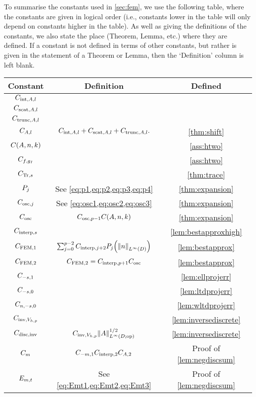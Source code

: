 To summarise the constants used in \cref{sec:fem}, we use the following table, where the constants are given in logical order (i.e., constants lower in the table will only depend on constants higher in the table). As well as giving the definitions of the constants, we also state the place (Theorem, Lemma, etc.) where they are defined. If a constant is not defined in terms of other constants, but rather is given in the statement of a Theorem or Lemma, then the `Definition' column is left blank.

\begin{tabular}{ccc}
  \toprule
  Constant & Definition & Defined\\
  \midrule
  $C_{\mathrm{int},A,l}$ & & \cite[Theorem 4.16]{Mc:00}\\
  $C_{\mathrm{scat},A,l}$ & & \cite[Theorem 4.18(i)]{Mc:00}\\
    $C_{\mathrm{trunc},A,l}$ & & \cite[Theorem 4.18(ii)]{Mc:00}\\
  $C_{A,l}$ & $C_{\mathrm{int},A,l} + C_{\mathrm{scat},A,l} + C_{\mathrm{trunc},A,l}.$ & \cref{thm:shift}\\
  $\CAnk$ && \cref{ass:htwo}\\
  $C_{f,g_{I}}$ && \cref{ass:htwo}\\
  $C_{\mathrm{Tr},s}$ && \cref{thm:trace}\\
  $P_{j}$ & See \cref{eq:p1,eq:p2,eq:p3,eq:p4}& \cref{thm:expansion}\\
  $C_{\mathrm{osc},j}$ & See \cref{eq:osc1,eq:osc2,eq:osc3} & \cref{thm:expansion}\\
  $C_{\mathrm{osc}}$ & $\Coscfn{p-1}\CAnk$ & \cref{thm:expansion}\\
  $C_{\mathrm{interp},s}$ && \cref{lem:bestapproxhigh}\\
  $C_{\mathrm{FEM},1}$ & $\sum_{j=0}^{p-2}\Cinterpfn{j+2} \Pj\mleft(\NLiD{n}\mright)$ & \cref{lem:bestapprox}\\
  $C_{\mathrm{FEM},2}$ & $C_{\mathrm{FEM},2} = C_{\mathrm{interp},p+1}C_{\mathrm{osc}}$ & \cref{lem:bestapprox}\\
  $C_{-s,1}$ && \cref{lem:ellprojerr} \\
  $C_{-s,0}$ && \cref{lem:ltdprojerr}\\
  $C_{n,-s,0}$ && \cref{lem:wltdprojerr}\\
  $C_{\mathrm{inv},V_{h,p}}$ && \cref{lem:inversediscrete}\\
  $C_{\mathrm{disc},\mathrm{inv}}$ & $\CinvVhp \NLiDop{A}^{1/2}$ & \cref{lem:inversediscrete}\\
  $C_{m}$ & $C_{-m,1} C_{\mathrm{interp},2} C_{A,2}$ & Proof of \cref{lem:negdiscsum}\\
  $E_{m,t}$ & See \cref{eq:Emt1,eq:Emt2,eq:Emt3} & Proof of \cref{lem:negdiscsum}\\

\end{tabular}
